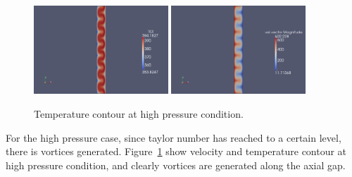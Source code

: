 \begin{figure}[htbp]
\begin{center}
\includegraphics[width=0.45\textwidth]{../3D/taylor-couette/temperature.png}
\includegraphics[width=0.45\textwidth]{../3D/taylor-couette/velocity.png}
\end{center}
\caption{Temperature contour at high pressure condition.}
\label{tv-fig}
\end{figure}

\medskip
For the high pressure case, since taylor number has reached to a certain level, there is vortices generated.
Figure~\ref{tv-fig} show velocity and temperature contour at high pressure
condition, and clearly vortices are generated along the axial gap.

